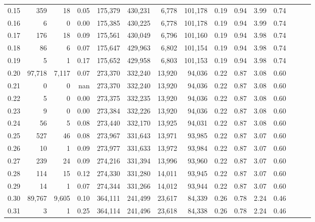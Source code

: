 \begin{tabular}{rrrrrrrrrrrrrrr}
0.15 &     359 &      18 &  0.05 &  175,379 &  430,231 &    6,778 &  101,178 &  0.19 &  0.94 &  3.99 &      0.74 \\
0.16 &       6 &       0 &  0.00 &  175,385 &  430,225 &    6,778 &  101,178 &  0.19 &  0.94 &  3.99 &      0.74 \\
0.17 &     176 &      18 &  0.09 &  175,561 &  430,049 &    6,796 &  101,160 &  0.19 &  0.94 &  3.98 &      0.74 \\
0.18 &      86 &       6 &  0.07 &  175,647 &  429,963 &    6,802 &  101,154 &  0.19 &  0.94 &  3.98 &      0.74 \\
0.19 &       5 &       1 &  0.17 &  175,652 &  429,958 &    6,803 &  101,153 &  0.19 &  0.94 &  3.98 &      0.74 \\
0.20 &  97,718 &   7,117 &  0.07 &  273,370 &  332,240 &   13,920 &   94,036 &  0.22 &  0.87 &  3.08 &      0.60 \\
0.21 &       0 &       0 &   nan &  273,370 &  332,240 &   13,920 &   94,036 &  0.22 &  0.87 &  3.08 &      0.60 \\
0.22 &       5 &       0 &  0.00 &  273,375 &  332,235 &   13,920 &   94,036 &  0.22 &  0.87 &  3.08 &      0.60 \\
0.23 &       9 &       0 &  0.00 &  273,384 &  332,226 &   13,920 &   94,036 &  0.22 &  0.87 &  3.08 &      0.60 \\
0.24 &      56 &       5 &  0.08 &  273,440 &  332,170 &   13,925 &   94,031 &  0.22 &  0.87 &  3.08 &      0.60 \\
0.25 &     527 &      46 &  0.08 &  273,967 &  331,643 &   13,971 &   93,985 &  0.22 &  0.87 &  3.07 &      0.60 \\
0.26 &      10 &       1 &  0.09 &  273,977 &  331,633 &   13,972 &   93,984 &  0.22 &  0.87 &  3.07 &      0.60 \\
0.27 &     239 &      24 &  0.09 &  274,216 &  331,394 &   13,996 &   93,960 &  0.22 &  0.87 &  3.07 &      0.60 \\
0.28 &     114 &      15 &  0.12 &  274,330 &  331,280 &   14,011 &   93,945 &  0.22 &  0.87 &  3.07 &      0.60 \\
0.29 &      14 &       1 &  0.07 &  274,344 &  331,266 &   14,012 &   93,944 &  0.22 &  0.87 &  3.07 &      0.60 \\
0.30 &  89,767 &   9,605 &  0.10 &  364,111 &  241,499 &   23,617 &   84,339 &  0.26 &  0.78 &  2.24 &      0.46 \\
0.31 &       3 &       1 &  0.25 &  364,114 &  241,496 &   23,618 &   84,338 &  0.26 &  0.78 &  2.24 &      0.46 \\

\end{tabular}
